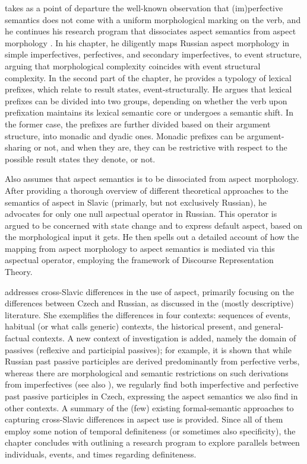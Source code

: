 \documentclass[output=paper,colorlinks,citecolor=brown]{langscibook}
\begin{document}
 takes as a point of departure the well-known observation that (im)perfective semantics does not come with a uniform morphological marking on the verb, and he continues his research program that dissociates aspect semantics from aspect morphology \citep[][]{Tatevosov2011,Tatevosov2015b}. In his chapter, he diligently maps Russian aspect morphology in simple imperfectives, perfectives, and secondary imperfectives, to event structure, arguing that morphological complexity coincides with event structural complexity. In the second part of the chapter, he provides a typology of lexical prefixes, which relate to result states, event-structurally. He argues that lexical prefixes can be divided into two groups, depending on whether the verb upon prefixation maintains its lexical semantic core or undergoes a semantic shift. In the former case, the prefixes are further divided based on their argument structure, into monadic and dyadic ones. Monadic prefixes can be argument-sharing or not, and when they are, they can be restrictive with respect to the possible result states they denote, or not. 

Also  assumes that aspect semantics is to be dissociated from aspect morphology. After providing a thorough overview of different theoretical approaches to the semantics of aspect in Slavic (primarly, but not exclusively Russian), he advocates for only one null aspectual operator in Russian. This operator is argued to be concerned with state change and to express default aspect, based on the morphological input it gets. He then spells out a detailed account of how the mapping from aspect morphology to aspect semantics is mediated via this aspectual operator, employing the framework of Discourse Representation Theory. 

 addresses cross-Slavic differences in the use of aspect, primarily focusing on the differences between Czech and Russian, as discussed in the (mostly descriptive) literature. She exemplifies the differences in four contexts: sequences of events, habitual (or what  calls generic) contexts, the historical present, and general-factual contexts. A new context of investigation is added, namely the domain of passives (reflexive and participial passives); for example, it is shown that while Russian past passive participles are derived predominantly from perfective verbs, whereas there are morphological and semantic restrictions on such derivations from imperfectives (see also \citealt{Borik.Gehrke2018}), we regularly find both imperfective and perfective past passive participles in Czech, expressing the aspect semantics we also find in other contexts. A summary of the (few) existing formal-semantic approaches to capturing cross-Slavic differences in aspect use is provided. Since all of them employ some notion of temporal definiteness (or sometimes also specificity), the chapter concludes with outlining a research program to explore parallels between individuals, events, and times regarding definiteness. 
\end{document}
